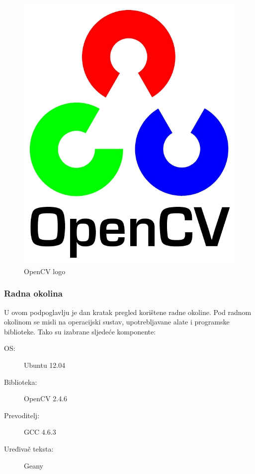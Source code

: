 \begin{figure}[h]
\centering
\includegraphics[scale=0.8]{figures/opencv.jpg}
\caption{OpenCV logo}
\label{fig:opencv.svg}
\end{figure}

\newpage
\subsubsection{Radna okolina} %
\label{sub:Radna okolina}

U ovom podpoglavlju je dan kratak pregled korištene radne okoline. Pod
radnom okolinom se misli na operacijski sustav, upotrebljavane alate i
programske biblioteke. Tako su izabrane sljedeće komponente:

\begin{description}
  \item[OS:] Ubuntu 12.04
  \item[Biblioteka:] OpenCV 2.4.6
  \item[Prevoditelj:] GCC 4.6.3 
  \item[Uređivač teksta:] Geany
\end{description}

